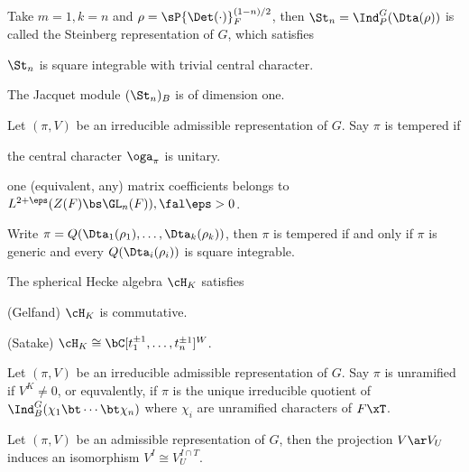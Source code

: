 \documentclass[a4paper, twoside]{article}
\begin{document}
\begin{thm}[{\cite[7.6, 7.7]{PR2008}}]
	Take $m=1,k=n$ and $\rho=\sP{\Det(\cdot)}_{F}^{(1-n)/2}$, then $\St_{n}=\Ind_{P}^{G}(\Dta(\rho))$ is called the Steinberg representation of $G$, which satisfies
	\begin{enr}
		\item $\St_{n}$ is square integrable with trivial central character.
		\item The Jacquet module $(\St_{n})_{B}$ is of dimension one.
	\end{enr}
\end{thm}


\begin{thm}[{\cite[9.5, 9.6]{PR2008}}]
	Let $(\pi,V)$ be an irreducible admissible representation of $G$. Say $\pi$ is tempered if
	\begin{enr}
		\item the central character $\oga_{\pi}$ is unitary.
		\item one (equivalent, any) matrix coefficients belongs to $L^{2+\eps}(Z(F)\bs \GL_{n}(F)),\fal\eps>0$.
	\end{enr}

	Write $\pi=Q(\Dta_{1}(\rho_{1}),\ldots,\Dta_{k}(\rho_{k}))$, then $\pi$ is tempered if and only if $\pi$ is generic and every $Q(\Dta_{i}(\rho_{i}))$ is square integrable.
\end{thm}

\begin{thm}[{\cite[9.7, 9.8]{PR2008}}]
	The spherical Hecke algebra $\cH_{K}$ satisfies
	\begin{enr}
		\item (Gelfand) $\cH_{K}$ is commutative.
		\item (Satake) $\cH_{K}\cong\bC[t_{1}^{\pm1},\ldots,t_{n}^{\pm1}]^{W}$.
	\end{enr}
\end{thm}

\begin{thm}[{\cite[9.9, 9.10]{PR2008}}]
	Let $(\pi,V)$ be an irreducible admissible representation of $G$. Say $\pi$ is unramified if $V^{K}\neq0$, or equvalently, if $\pi$ is the unique irreducible quotient of $\Ind_{B}^{G}(\chi_{1}\bt\cdots\bt\chi_{n})$ where $\chi_{i}$ are unramified characters of $F\xT$.
\end{thm}

\begin{thm}[{\cite[9.14]{PR2008}}]
	Let $(\pi,V)$ be an admissible representation of $G$, then the projection $V\ar V_{U}$ induces an isomorphism $V^{I}\cong V_{U}^{I\cap T}$.
\end{thm}
\end{document}
